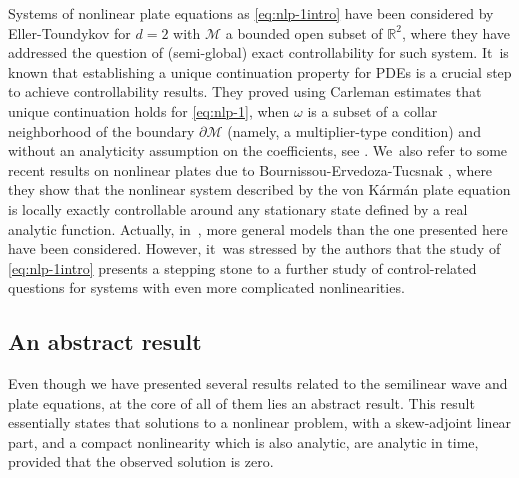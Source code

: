 \documentclass[JEP,XML,SOM,Unicode,published]{cedram}
\theoremstyle{definition}
\let\mc\mathcal
\newcommand{\M}{\mc{M}}
\newcommand{\R}{\mathbb{R}}
\begin{document}
Systems of nonlinear plate equations as \eqref{eq:nlp-1intro} have been considered by Eller-Toundykov \cite{ET:15} for $d=2$ with $\M$ a bounded open subset of $\R^2$, where they have addressed the question of (semi-global) exact controllability for such system. It~is known that establishing a unique continuation property for PDEs is a crucial step to achieve controllability results. They proved using Carleman estimates that unique continuation holds for \eqref{eq:nlp-1}, when $\omega$ is a subset of a collar neighborhood of the boundary $\partial \M$ (namely, a multiplier-type condition) and without an analyticity assumption on the coefficients, see \cite[Lem.\,4.1]{ET:15}. We~also refer to some recent results on nonlinear plates due to Bournissou-Ervedoza-Tucsnak \cite{TBE24}, where they show that the nonlinear system described by the von K\'arm\'an plate equation is locally exactly controllable around any stationary state defined by a real analytic function. Actually, in~\cite{ET:15}, more general models than the one presented here have been considered. However, it~was stressed by the authors that the study of \eqref{eq:nlp-1intro} presents a stepping stone to a further study of control-related questions for systems with even more complicated nonlinearities.
\subsection{An abstract result}\label{s:abstrIntro} Even though we have presented several results related to the semilinear wave and plate equations, at the core of all of them lies an abstract result. This result essentially states that solutions to a nonlinear problem, with a skew-adjoint linear part, and a compact nonlinearity which is also analytic, are analytic in time, provided that the observed solution is zero.
\end{document}
